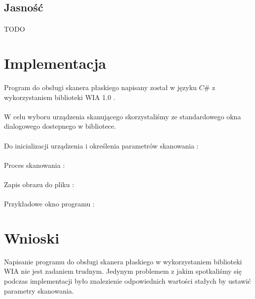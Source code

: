 \documentclass[wide,a4paper,titlepage,12pt] {article}
\begin{document}
\subsection{Jasność}
\paragraph{} %
\label{par:}
TODO

\section{Implementacja}
\paragraph{} %
\label{par:}
Program do obsługi skanera płaskiego napisany został w języku $C\#$ z wykorzystaniem biblioteki WIA 1.0 .

\paragraph{} %
\label{}
W celu wyboru urządzenia skanującego skorzystaliśmy ze standardowego okna dialogowego dostepnego w bibliotece.


\paragraph{}
Do inicializacji urządzenia i określenia parametrów skanowania : 

\paragraph{} %
\label{par:}
Proces skanowania :

\paragraph{} %
\label{par:}
Zapis obrazu do pliku :

\paragraph{} %
\label{par:}
Przykładowe okno programu :


\section{Wnioski}
Napisanie programu do obsługi skanera płaskiego w wykorzystaniem biblioteki WIA nie jest zadaniem trudnym. Jedynym problemem z jakim spotkaliśmy się podczas implementacji było znalezienie odpowiednich wartości stałych by ustawić parametry skanowania.
\paragraph{}
\end{document}
